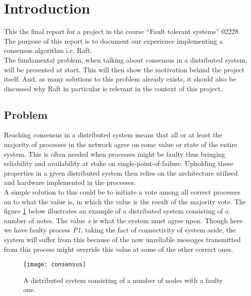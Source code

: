 \section{Introduction} %
\label{sec:introduction}

This the final report for a project in the course ``Fault tolerant systems'' 02228. The purpose of this report is to document our experience implementing a consensus algorithm i.e. Raft. \\

The fundamental problem, when talking about consensus in a distributed system, will be presented at start. This will then show the motivation behind the project itself. And, as many solutions to this problem already exists, it should also be discussed why Raft in particular is relevant in the context of this project.

\subsection{Problem}
Reaching consensus in a distributed system means that all or at least the majority of processes in the network agree on some value or state of the entire system. This is often needed when processes might be faulty thus bringing reliability and availability at stake on single-point-of-failure. Upholding these properties in a given distributed system then relies on the architecture utilised and hardware implemented in the processes.\\ A simple solution to this could be to initiate a vote among all correct processes on to what the value is, in which the value is the result of the majority vote. The figure \ref{consensus} below illustrates an example of a distributed system consisting of a number of notes. The value \textit{x} is what the system must agree upon. Though here we have faulty process \textit{P1}, taking the fact of connectivity of system aside, the system will suffer from this because of the now unreliable messages transmitted from this process might override this value at some of the other correct ones. \\


\begin{figure}[h]
	\centering
	\texttt{[image: consensus]}
	\caption{A distributed system consisting of a number of nodes with a faulty one.}
	\label{consensus}
\end{figure}

